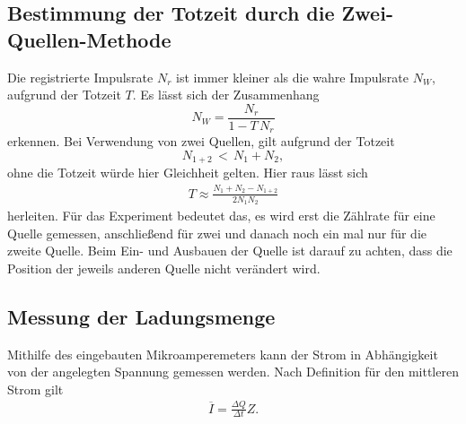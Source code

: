 \subsection{Bestimmung der Totzeit durch die Zwei-Quellen-Methode}
Die registrierte Impulsrate $N_r$ ist immer kleiner als die wahre Impulsrate $N_W$, aufgrund der Totzeit $T$. Es lässt sich der Zusammenhang
$$
N_W=\frac{N_r}{1-T \, N_r}
$$
erkennen. Bei Verwendung von zwei Quellen, gilt aufgrund der Totzeit 
$$
N_{1+2}\, <\, N_1+N_2,
$$
ohne die Totzeit würde hier Gleichheit gelten. Hier raus lässt sich
\begin{align}
\label{eq:Theorie_Totzeit}
T\approx\frac{N_1+N_2-N_{1+2}}{2N_1N_2}
\end{align}
herleiten. Für das Experiment bedeutet das, es wird erst die Zählrate für eine Quelle gemessen, anschließend für zwei und danach noch ein mal nur für die zweite Quelle. Beim Ein- und Ausbauen der Quelle ist darauf zu achten, dass die Position der jeweils anderen Quelle nicht verändert wird.
\subsection{Messung der Ladungsmenge}
Mithilfe des eingebauten Mikroamperemeters kann der Strom in Abhängigkeit von der angelegten Spannung gemessen werden. Nach Definition für den mittleren Strom gilt
\begin{align}
\label{eq:Theorie_Ladungsmenge}
\overline{I}=\frac{\Delta Q}{\Delta t}Z.
\end{align}